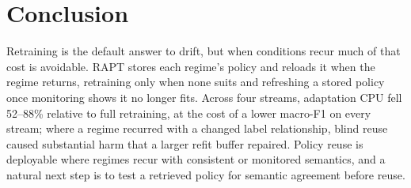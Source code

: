\documentclass[conference]{IEEEtran}
\begin{document}
\section{Conclusion}


Retraining is the default answer to drift, but when conditions recur much of that cost
is avoidable. RAPT stores each regime's policy and reloads it when the regime returns,
retraining only when none suits and refreshing a stored policy once monitoring shows it
no longer fits. Across four streams, adaptation CPU fell 52--88\% relative to full
retraining, at the cost of a lower macro-F1 on every stream; where a regime recurred
with a changed label relationship, blind reuse caused substantial harm that a larger
refit buffer repaired. Policy reuse is deployable where regimes recur with consistent or
monitored semantics, and a natural next step is to test a retrieved policy for semantic
agreement before reuse.




\end{document}
